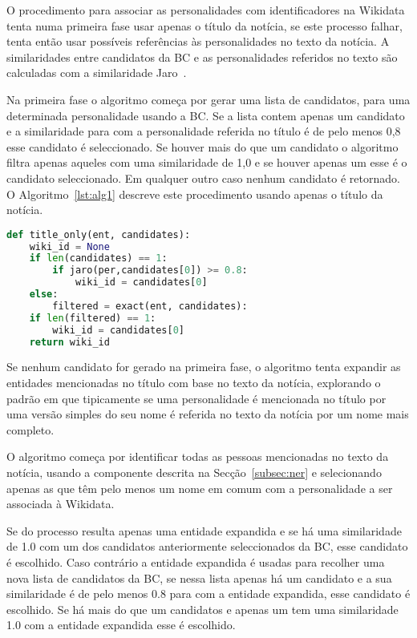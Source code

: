 \documentclass[a4paper, twocolumn, 11pt, twoside]{article}
\begin{document}
O procedimento para associar as personalidades com identificadores na Wikidata tenta numa primeira fase usar apenas o título da notícia, se este processo falhar, tenta então usar possíveis referências às personalidades no texto da notícia. A similaridades entre candidatos da BC e as personalidades referidos no texto são calculadas com a similaridade Jaro~\citep{jaro1989}.

Na primeira fase o algoritmo começa por gerar uma lista de candidatos, para uma determinada personalidade usando a BC. Se a lista contem apenas um candidato e a similaridade para com a personalidade referida no título é de pelo menos 0,8 esse candidato é seleccionado. Se houver mais do que um candidato o algoritmo filtra apenas aqueles com uma similaridade de 1,0 e se houver apenas um esse é o candidato seleccionado. Em qualquer outro caso nenhum candidato é retornado. O Algoritmo~\ref{lst:alg1} descreve este procedimento usando apenas o título da notícia.

\begin{lstlisting}[language=python,columns=fullflexible,frame=single,label={lst:alg1},title={Algoritmo 1. Ligação com a Wikidata usando apenas o título.},captionpos=b]
def title_only(ent, candidates):
    wiki_id = None
    if len(candidates) == 1:
        if jaro(per,candidates[0]) >= 0.8:
            wiki_id = candidates[0]
    else:
        filtered = exact(ent, candidates):
	if len(filtered) == 1:
	    wiki_id = candidates[0]
    return wiki_id
\end{lstlisting}

Se nenhum candidato for gerado na primeira fase, o algoritmo tenta expandir as entidades mencionadas no título com base no texto da notícia, explorando o padrão em que tipicamente se uma personalidade é mencionada no título por uma versão simples do seu nome é referida no texto da notícia por um nome mais completo.

O algoritmo começa por identificar todas as pessoas mencionadas no texto da notícia, usando a componente descrita na Secção~\ref{subsec:ner} e selecionando apenas as que têm pelo menos um nome em comum com a personalidade a ser associada à Wikidata. 

Se do processo resulta apenas uma entidade expandida e se há uma similaridade de 1.0 com um dos candidatos anteriormente seleccionados da BC, esse candidato é escolhido. Caso contrário a entidade expandida é usadas para recolher uma nova lista de candidatos da BC, se nessa lista apenas há um candidato e a sua similaridade é de pelo menos 0.8 para com a entidade expandida, esse candidato é escolhido. Se há mais do que um candidatos e apenas um tem uma similaridade 1.0 com a entidade expandida esse é escolhido. 
\end{document}
